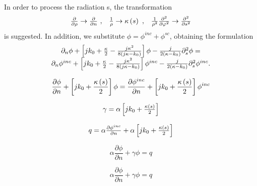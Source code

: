 In order to process the radiation \bc s, the transformation
\begin{equation}
\label{eq:Rad BC transformation}
\begin{array}{ccc}
\frac{\partial}{\partial \rho} \rightarrow \frac{\partial}{\partial n}\,\,, & 
\frac{1}{\rho} \rightarrow \kappa\left({s}\right)\,\,, & 
\frac{1}{\rho^2}\frac{\partial^2}{\partial \varphi^2} \rightarrow \frac{\partial^2}{\partial s^2}
\end{array}
\end{equation}
is suggested. In addition, we substitute $\phi = \phi^{inc} + \phi^{sc}$, obtaining the formulation
\begin{equation}
\begin{array}{c}
\partial_n\phi + \left[{
	j k_0 + \frac{\kappa}{2} - 
	\frac{j\kappa^2}{8\left({j\kappa - k_0}\right)}
}\right]\phi
-
\frac{j}{2\left({\kappa - k_0}\right)}\partial_s^2 \phi
= \\
\partial_n\phi^{inc} + \left[{
	j k_0 + \frac{\kappa}{2} - 
	\frac{j\kappa^2}{8\left({j\kappa - k_0}\right)}
}\right]\phi^{inc}
-
\frac{j}{2\left({\kappa - k_0}\right)}\partial_s^2 \phi^{inc}.
\end{array}
\end{equation}

\begin{equation}
\frac{\partial \phi}{\partial n} + 
\left[{
	jk_0 + \frac{\kappa\left({s}\right)}{2}
}\right]\phi
=
\frac{\partial \phi^{inc}}{\partial n} + 
\left[{
	jk_0 + \frac{\kappa\left({s}\right)}{2}
}\right]\phi^{inc}
\end{equation}

\begin{equation}
\begin{array}{c}
\gamma = \alpha\left[{jk_0 + \frac{\kappa\left({s}\right)}{2}}\right] \\ \\ 
q = \alpha\frac{\partial \phi^{inc}}{\partial n} + 
\alpha\left[{jk_0 + \frac{\kappa\left({s}\right)}{2}}\right]
\end{array}
\end{equation}

\begin{equation}
\alpha\frac{\partial \phi}{\partial n} + \gamma\phi = q
\end{equation}

\begin{equation}
\alpha\frac{\partial \phi}{\partial n} + \gamma\phi = q
\end{equation}

